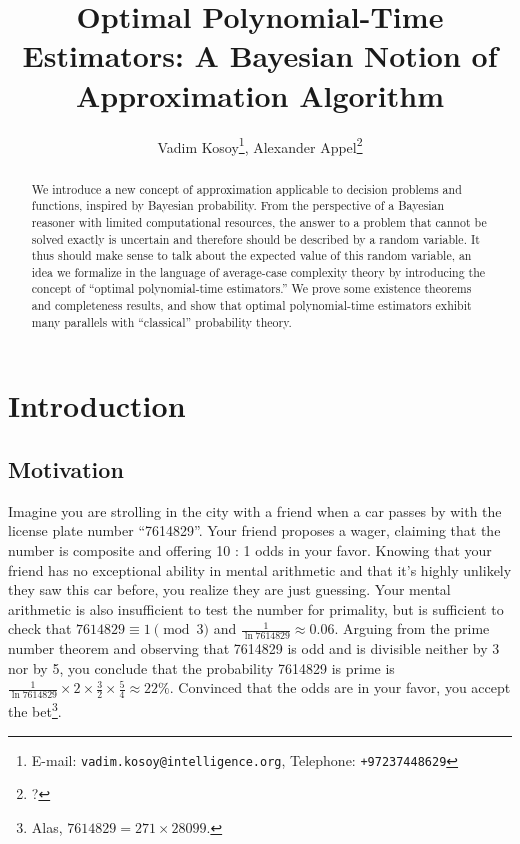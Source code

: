 \documentclass[11pt]{article}
\numberwithin{equation}{section}
\theoremstyle{definition}
\theoremstyle{plain}
\begin{document}
\title{Optimal Polynomial-Time Estimators: A Bayesian Notion of Approximation Algorithm}

\author{Vadim Kosoy\thanks{E-mail: \texttt{vadim.kosoy@intelligence.org}, Telephone: \texttt{+97237448629}}, Alexander Appel\thanks{?}}

\date{}

\maketitle

\begin{abstract}
We introduce a new concept of approximation applicable to decision problems and functions, inspired by Bayesian probability. From the perspective of a Bayesian reasoner with limited computational resources, the answer to a problem that cannot be solved exactly is uncertain and therefore should be described by a random variable. It thus should make sense to talk about the expected value of this random variable, an idea we formalize in the language of average-case complexity theory by introducing the concept of \enquote{optimal polynomial-time estimators.} We prove some existence theorems and completeness results, and show that optimal polynomial-time estimators exhibit many parallels with \enquote{classical} probability theory.%
\end{abstract}%

\pagebreak

\tableofcontents

\setcounter{section}{-1}

\section{Introduction}

\subsection{Motivation}
\label{subsec:mot}

Imagine you are strolling in the city with a friend when a car passes by with the license plate number \enquote{7614829}. Your friend proposes a wager, claiming that the number is composite and offering 10 : 1 odds in your favor. Knowing that your friend has no exceptional ability in mental arithmetic and that it's highly unlikely they saw this car before, you realize they are just guessing. Your mental arithmetic is also insufficient to test the number for primality, but is sufficient to check that ${7614829 \equiv 1 \pmod{3}}$ and $\frac{1}{\ln 7614829} \approx 0.06$. Arguing from the prime number theorem and observing that 7614829 is odd and is divisible neither by 3 nor by 5, you conclude that the probability 7614829 is prime is ${\frac{1}{\ln 7614829} \times 2 \times \frac{3}{2} \times \frac{5}{4} \approx 22\%}$. Convinced that the odds are in your favor, you accept the bet\footnote{Alas, $7614829 = 271 \times 28099$.}.
\end{document}
